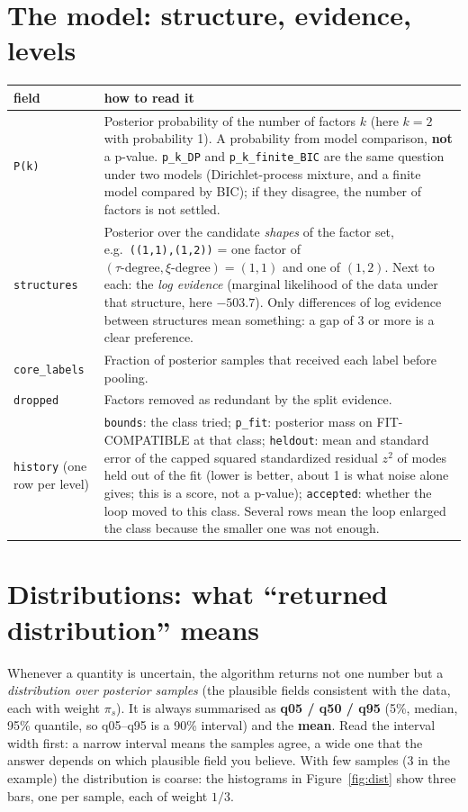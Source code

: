 \documentclass[11pt,a4paper]{article}
\newcommand{\code}[1]{\texttt{#1}}
\begin{document}
\section{The model: structure, evidence, levels}
\begin{center}\small
\begin{tabular}{L{4.0cm}L{10.0cm}}\toprule
\textbf{field} & \textbf{how to read it}\\\midrule
\code{P(k)} & Posterior probability of the number of factors $k$ (here $k=2$ with probability 1). A probability from model comparison, \textbf{not} a p-value. \code{p\_k\_DP} and \code{p\_k\_finite\_BIC} are the same question under two models (Dirichlet-process mixture, and a finite model compared by BIC); if they disagree, the number of factors is not settled.\\
\code{structures} & Posterior over the candidate \emph{shapes} of the factor set, e.g.\ \code{((1,1),(1,2))} = one factor of $(\tau\text{-degree},\xi\text{-degree})=(1,1)$ and one of $(1,2)$. Next to each: the \emph{log evidence} (marginal likelihood of the data under that structure, here $-503.7$). Only differences of log evidence between structures mean something: a gap of 3 or more is a clear preference.\\
\code{core\_labels} & Fraction of posterior samples that received each label before pooling.\\
\code{dropped} & Factors removed as redundant by the split evidence.\\
\code{history} (one row per level) & \code{bounds}: the class tried; \code{p\_fit}: posterior mass on FIT-COMPATIBLE at that class; \code{heldout}: mean and standard error of the capped squared standardized residual $z^2$ of modes held out of the fit (lower is better, about 1 is what noise alone gives; this is a score, not a p-value); \code{accepted}: whether the loop moved to this class. Several rows mean the loop enlarged the class because the smaller one was not enough.\\\bottomrule
\end{tabular}
\end{center}

\section{Distributions: what ``returned distribution'' means}\label{sec:dist}
Whenever a quantity is uncertain, the algorithm returns not one number but a \emph{distribution over posterior samples} (the plausible fields consistent with the data, each with weight $\pi_s$). It is always summarised as \textbf{q05 / q50 / q95} (5\%, median, 95\% quantile, so q05--q95 is a 90\% interval) and the \textbf{mean}. Read the interval width first: a narrow interval means the samples agree, a wide one that the answer depends on which plausible field you believe. With few samples (3 in the example) the distribution is coarse: the histograms in Figure~\ref{fig:dist} show three bars, one per sample, each of weight $1/3$.
\end{document}
